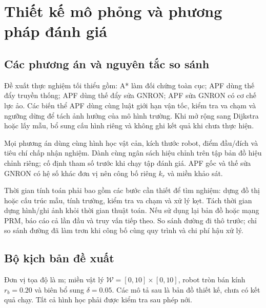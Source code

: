 \documentclass[12pt,a4paper,oneside]{report}
\numberwithin{equation}{chapter}
\begin{document}
\section{Thiết kế mô phỏng và phương pháp đánh giá}

\subsection{Các phương án và nguyên tắc so sánh}

Đề xuất thực nghiệm tối thiểu gồm: A* làm đối chứng toàn cục; APF dùng thế đẩy truyền thống; APF dùng thế đẩy sửa GNRON; APF sửa GNRON có cơ chế lực ảo. Các biến thể APF dùng cùng luật giới hạn vận tốc, kiểm tra va chạm và ngưỡng dừng để tách ảnh hưởng của mô hình trường. Khi mở rộng sang Dijkstra hoặc lấy mẫu, bổ sung cấu hình riêng và không ghi kết quả khi chưa thực hiện.

Mọi phương án dùng cùng hình học vật cản, kích thước robot, điểm đầu/đích và tiêu chí chấp nhận nghiệm. Dành cùng ngân sách hiệu chỉnh trên tập bản đồ hiệu chỉnh riêng; cố định tham số trước khi chạy tập đánh giá. APF gốc và thế sửa GNRON có hệ số khác đơn vị nên công bố riêng $k_r$ và miền khảo sát.

Thời gian tính toán phải bao gồm các bước cần thiết để tìm nghiệm: dựng đồ thị hoặc cấu trúc mẫu, tính trường, kiểm tra va chạm và xử lý kẹt. Tách thời gian dựng hình/ghi ảnh khỏi thời gian thuật toán. Nếu sử dụng lại bản đồ hoặc mạng PRM, báo cáo cả lần đầu và truy vấn tiếp theo. So sánh đường đi thô trước; chỉ so sánh đường đã làm trơn khi công bố cùng quy trình và chi phí hậu xử lý.

\subsection{Bộ kịch bản đề xuất}

Đơn vị tọa độ là m; miền vật lý $\mathcal W=[0,10]\times[0,10]$, robot tròn bán kính $r_b=0.20$ và biên bổ sung $\delta=0.05$. Các mô tả sau là bản đồ thiết kế, chưa có kết quả chạy. Tất cả hình học phải được kiểm tra sau phép nới.
\end{document}
